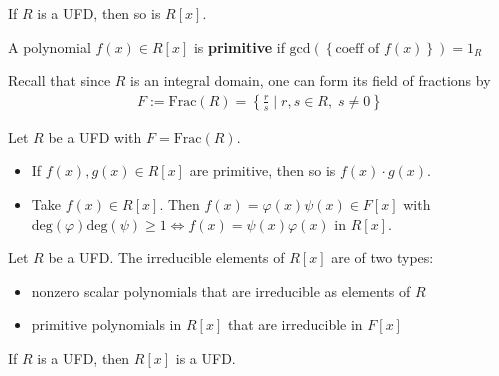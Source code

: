 \documentclass{memoir}
\begin{document}


\begin{thm}
	If \(R\) is a UFD, then so is \(R[x]\).
\end{thm}

\begin{defn}
	A polynomial \(f(x) \in R[x]\) is \textbf{primitive} if \( \textrm{gcd}(\left\{ \text{coeff of }f(x) \right\} ) = 1_R\)
\end{defn}
Recall that since \(R\) is an integral domain, one can form its field of fractions by
\begin{align*}
	F:= \textrm{Frac}(R) = \left\{ \frac{r}{s} \mid r,s \in R, \; s \neq 0 \right\} 
\end{align*}
\begin{lemma}
	Let \(R\) be a UFD with \(F = \textrm{Frac}(R)\).
	\begin{itemize}
		\item If \(f(x),g(x) \in R[x]\) are primitive, then so is \(f(x)\cdot g(x)\).
		\item Take \(f(x) \in R[x]\). Then \(f(x) = \varphi(x) \psi(x) \in F[x]\) with \( \textrm{deg}(\varphi) \textrm{deg}(\psi)\geq 1 \iff f(x) = \psi(x) \varphi(x)\) in \(R[x]\).
	\end{itemize}
\end{lemma}

\begin{cor}
	Let \(R\) be a UFD. The irreducible elements of \(R[x]\) are of two types:
	\begin{itemize}
		\item nonzero scalar polynomials that are irreducible as elements of \(R\) 
		\item primitive polynomials in \(R[x]\) that are irreducible in \(F[x]\)
	\end{itemize}
\end{cor}

\begin{thm}
	If \(R\) is a UFD, then \(R[x]\) is a UFD.
\end{thm}
\end{document}
